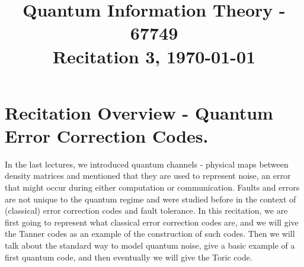 \documentclass[12pt,a4paper]{article}
\title{ \begin{framed} Quantum Information Theory - 67749 \\ 
Recitation 3, \today \end{framed}  }
\date{\vspace{-5ex}}
\begin{document}
 
\maketitle{ }    



\newcommand{\CCZ}{\textbf{CCZ}}
\newcommand{\CCX}{\textbf{CCX}}


\setcounter{enumcirc}{1} 


\newcommand{\advanceday}[1][21]{%
\begingroup
\AdvanceDate[#1]%
\today%
\endgroup
}%


\newcommand{\subqCircEx}[2]{\begin{subfigure}[t]{0.5\textwidth}
        \stepcounter{enumcirc} \caption*{ (\alph{enumcirc}) #1} \centering 
        #2
    \end{subfigure}
}

\newcommand{\qCircEx}[4]{\begin{figure*}[h!]
    \centering
    \subqCircEx{#1}{#2}
    ~ 
    \subqCircEx{#3}{#4}
\end{figure*}
}

\newcommand{\qCircExfullline}[2]{\begin{figure*}[h!]
    \stepcounter{enumcirc} \caption*{ (\alph{enumcirc}) #1}
        \centering 
        #2
\end{figure*}
}

\section{Recitation Overview - Quantum Error Correction Codes.}


In the last lectures, we introduced quantum channels - physical maps between density matrices and mentioned that they are used to represent noise, an error that might occur during either computation or communication. Faults and errors are not unique to the quantum regime and were studied before in the context of (classical) error correction codes and fault tolerance. In this recitation, we are first going to represent what classical error correction codes are, and we will give the Tanner codes as an example of the construction of such codes. Then we will talk about the standard way to model quantum noise, give a basic example of a first quantum code, and then eventually we will give the Toric code.
\end{document}
